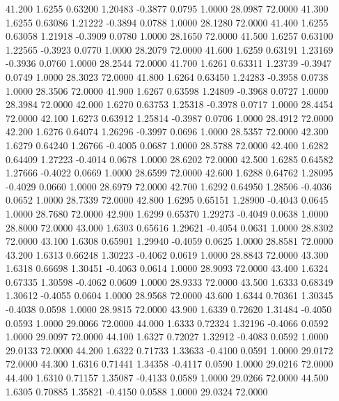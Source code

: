   41.200   1.6255   0.63200   1.20483  -0.3877   0.0795   1.0000  28.0987  72.0000
  41.300   1.6255   0.63086   1.21222  -0.3894   0.0788   1.0000  28.1280  72.0000
  41.400   1.6255   0.63058   1.21918  -0.3909   0.0780   1.0000  28.1650  72.0000
  41.500   1.6257   0.63100   1.22565  -0.3923   0.0770   1.0000  28.2079  72.0000
  41.600   1.6259   0.63191   1.23169  -0.3936   0.0760   1.0000  28.2544  72.0000
  41.700   1.6261   0.63311   1.23739  -0.3947   0.0749   1.0000  28.3023  72.0000
  41.800   1.6264   0.63450   1.24283  -0.3958   0.0738   1.0000  28.3506  72.0000
  41.900   1.6267   0.63598   1.24809  -0.3968   0.0727   1.0000  28.3984  72.0000
  42.000   1.6270   0.63753   1.25318  -0.3978   0.0717   1.0000  28.4454  72.0000
  42.100   1.6273   0.63912   1.25814  -0.3987   0.0706   1.0000  28.4912  72.0000
  42.200   1.6276   0.64074   1.26296  -0.3997   0.0696   1.0000  28.5357  72.0000
  42.300   1.6279   0.64240   1.26766  -0.4005   0.0687   1.0000  28.5788  72.0000
  42.400   1.6282   0.64409   1.27223  -0.4014   0.0678   1.0000  28.6202  72.0000
  42.500   1.6285   0.64582   1.27666  -0.4022   0.0669   1.0000  28.6599  72.0000
  42.600   1.6288   0.64762   1.28095  -0.4029   0.0660   1.0000  28.6979  72.0000
  42.700   1.6292   0.64950   1.28506  -0.4036   0.0652   1.0000  28.7339  72.0000
  42.800   1.6295   0.65151   1.28900  -0.4043   0.0645   1.0000  28.7680  72.0000
  42.900   1.6299   0.65370   1.29273  -0.4049   0.0638   1.0000  28.8000  72.0000
  43.000   1.6303   0.65616   1.29621  -0.4054   0.0631   1.0000  28.8302  72.0000
  43.100   1.6308   0.65901   1.29940  -0.4059   0.0625   1.0000  28.8581  72.0000
  43.200   1.6313   0.66248   1.30223  -0.4062   0.0619   1.0000  28.8843  72.0000
  43.300   1.6318   0.66698   1.30451  -0.4063   0.0614   1.0000  28.9093  72.0000
  43.400   1.6324   0.67335   1.30598  -0.4062   0.0609   1.0000  28.9333  72.0000
  43.500   1.6333   0.68349   1.30612  -0.4055   0.0604   1.0000  28.9568  72.0000
  43.600   1.6344   0.70361   1.30345  -0.4038   0.0598   1.0000  28.9815  72.0000
  43.900   1.6339   0.72620   1.31484  -0.4050   0.0593   1.0000  29.0066  72.0000
  44.000   1.6333   0.72324   1.32196  -0.4066   0.0592   1.0000  29.0097  72.0000
  44.100   1.6327   0.72027   1.32912  -0.4083   0.0592   1.0000  29.0133  72.0000
  44.200   1.6322   0.71733   1.33633  -0.4100   0.0591   1.0000  29.0172  72.0000
  44.300   1.6316   0.71441   1.34358  -0.4117   0.0590   1.0000  29.0216  72.0000
  44.400   1.6310   0.71157   1.35087  -0.4133   0.0589   1.0000  29.0266  72.0000
  44.500   1.6305   0.70885   1.35821  -0.4150   0.0588   1.0000  29.0324  72.0000

